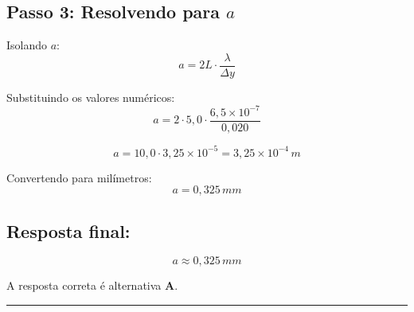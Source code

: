 \begin{flushleft}
\vspace{0.5cm}

\subsection*{Passo 3: Resolvendo para \(a\)}

Isolando \(a\):
\[
a = 2L \cdot \frac{\lambda}{\Delta y}
\]

Substituindo os valores numéricos:
\[
a = 2 \cdot 5{,}0 \cdot \frac{6{,}5 \times 10^{-7}}{0{,}020}
\]

\[
a = 10{,}0 \cdot 3{,}25 \times 10^{-5} = 3{,}25 \times 10^{-4}\,m
\]

Convertendo para milímetros:
\[
a = 0{,}325\,mm
\]

\vspace{0.5cm}

\subsection*{Resposta final:}

\[
\boxed{a \approx 0{,}325\,mm}
\]

A resposta correta é alternativa \colorbox{green!50}{\textbf{A}}.
\end{flushleft}

\noindent\rule{\linewidth}{0.6pt}\\

